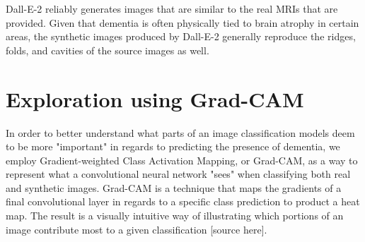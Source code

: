 \documentclass [MAS] {uclathes}
\begin{document}
Dall-E-2 reliably generates images that are similar to the real MRIs that are provided. Given that dementia is often 
physically tied to brain atrophy in certain areas, the synthetic images produced by Dall-E-2 generally reproduce the 
ridges, folds, and cavities of the source images as well.

\chapter{Exploration using Grad-CAM}
In order to better understand what parts of an image classification models deem to be more "important" in regards to 
predicting the presence of dementia, we employ Gradient-weighted Class Activation Mapping, or Grad-CAM, as a way to 
represent what a convolutional neural network "sees" when classifying both real and synthetic images. Grad-CAM is a 
technique that maps the gradients of a final convolutional layer in regards to a specific class prediction to product a 
heat map. The result is a visually intuitive way of illustrating which portions of an image contribute most to a given 
classification [source here].
\end{document}
